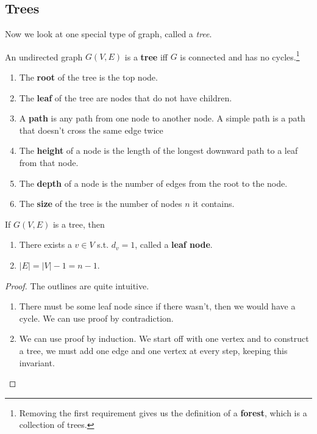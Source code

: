 \subsection{Trees} 

  Now we look at one special type of graph, called a \textit{tree}. 

  \begin{definition}[Trees]
    An undirected graph $G(V, E)$ is a \textbf{tree} iff $G$ is connected and has no cycles.\footnote{ Removing the first requirement gives us the definition of a \textbf{forest}, which is a collection of trees. }
    \begin{enumerate}
      \item The \textbf{root} of the tree is the top node. 
      \item The \textbf{leaf} of the tree are nodes that do not have children. 
      \item A \textbf{path} is any path from one node to another node. A simple path is a path that doesn't cross the same edge twice 
      \item The \textbf{height} of a node is the length of the longest downward path to a leaf from that node. 
      \item The \textbf{depth} of a node is the number of edges from the root to the node. 
      \item The \textbf{size} of the tree is the number of nodes $n$ it contains. 
    \end{enumerate}
  \end{definition}

  \begin{theorem}
    If $G(V, E)$ is a tree, then 
    \begin{enumerate}
      \item There exists a $v \in V$ s.t. $d_v = 1$, called a \textbf{leaf node}. 
      \item $|E| = |V| - 1 = n - 1$. 
    \end{enumerate}
  \end{theorem}
  \begin{proof}
    The outlines are quite intuitive. 
    \begin{enumerate}
      \item There must be some leaf node since if there wasn't, then we would have a cycle. We can use proof by contradiction. 
      \item We can use proof by induction. We start off with one vertex and to construct a tree, we must add one edge and one vertex at every step, keeping this invariant.  
    \end{enumerate}
  \end{proof} 

